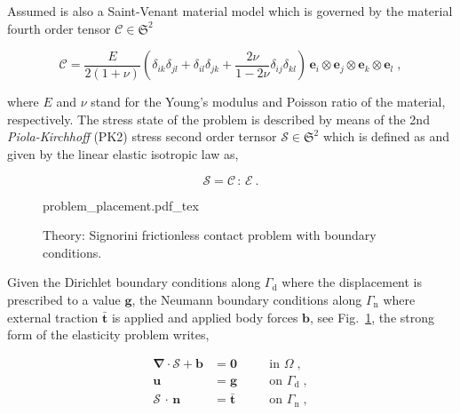 \documentclass[10pt,a4paper]{article}
\begin{document}
Assumed is also a Saint-Venant material model which is governed by the material fourth order tensor $\mathcal{C} \in \mathfrak{S}^2$

\begin{equation}
	\boldsymbol{\mathcal{C}} = \frac{E}{2 (1 + \nu)} \left( \delta_{ik} \delta_{jl} + \delta_{il} \delta_{jk} + \frac{2 \nu}{1 - 2 \nu} \delta_{ij} \delta_{kl} \right) \, \mathbf{e}_i \otimes \mathbf{e}_j \otimes \mathbf{e}_k \otimes \mathbf{e}_l \;, \label{eq:material_tensor}
\end{equation}

where $E$ and $\nu$ stand for the Young's modulus and Poisson ratio of the material, respectively. The stress state of the problem is described by means of the 2nd \textit{Piola-Kirchhoff} (PK2) stress second order ternsor $\boldsymbol{\mathcal{S}} \in \mathfrak{S}^2$ which is defined as and given by the linear elastic isotropic law as,

\begin{equation}
	\boldsymbol{\mathcal{S}} = \boldsymbol{\mathcal{C}} \, : \, \boldsymbol{\mathcal{E}} \:.
\end{equation}

\begin{figure}[!t]
	\centering
	\footnotesize
    \def\svgwidth{0.5\textwidth}{problem_placement.pdf_tex}
	\caption{Theory: Signorini frictionless contact problem with boundary conditions.}
	\label{im:signorini_contact_problem}
\end{figure}

Given the Dirichlet boundary conditions along $\Gamma_{\text{d}}$ where the displacement is prescribed to a value $\mathbf{g}$, the Neumann boundary conditions along $\Gamma_{\text{n}}$ where external traction $\bar{\mathbf{t}}$ is applied and applied body forces $\mathbf{b}$, see Fig.~\ref{im:signorini_contact_problem}, the strong form of the elasticity problem writes,

\begin{subequations}
	\begin{alignat}{2}
		\boldsymbol{\nabla} \cdot \boldsymbol{\mathcal{S}} + \mathbf{b} &= \mathbf{0} \quad &&\text{in } \Omega \;, \label{eq:strong_equilibrium} \\
		\mathbf{u} &= \mathbf{g} &&\text{on } \Gamma_{\text{d}} \;, \label{eq:prescribed_displacement} \\
		\boldsymbol{\mathcal{S}} \, \cdot \, \mathbf{n} &= \bar{\mathbf{t}} &&\text{on } \Gamma_{\text{n}} \;,
	\end{alignat}
\end{subequations}
\end{document}
